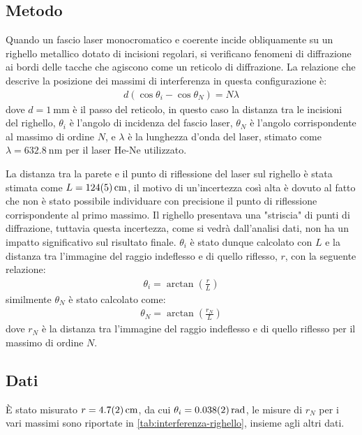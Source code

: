 \documentclass[a4paper]{article}
\begin{document}
\subsection{Metodo}
Quando un fascio laser monocromatico e coerente incide obliquamente su un righello metallico dotato di incisioni regolari, si verificano fenomeni di diffrazione ai bordi delle tacche che agiscono come un reticolo di diffrazione. La relazione che descrive la posizione dei massimi di interferenza in questa configurazione è: 
\begin{align}
    d(\cos\theta_i - \cos\theta_N) = N\lambda
\end{align}
dove $d=\SI{1}{\milli\meter}$ è il passo del reticolo, in questo caso la distanza tra le incisioni del righello, $\theta_i$ è l'angolo di incidenza del fascio laser, $\theta_N$ è l'angolo corrispondente al massimo di ordine $N$, e $\lambda$ è la lunghezza d'onda del laser, stimato come $\lambda=\SI{632.8}{\nano\meter}$ per il laser He-Ne utilizzato.

La distanza tra la parete e il punto di riflessione del laser sul righello è stata stimata come $L=\SI{124 \pm 5}{\centi\meter}$, il motivo di un'incertezza così alta è dovuto al fatto che non è stato possibile individuare con precisione il punto di riflessione corrispondente al primo massimo. Il righello presentava una "striscia" di punti di diffrazione, tuttavia questa incertezza, come si vedrà dall'analisi dati, non ha un impatto significativo sul risultato finale. $\theta_i$ è stato dunque calcolato con $L$ e la distanza tra l'immagine del raggio indeflesso e di quello riflesso, $r$, con la seguente relazione:
\begin{align}   
    \theta_i = \arctan\left(\frac{r}{L}\right)
\end{align}
similmente $\theta_N$ è stato calcolato come:
\begin{align}
    \theta_N = \arctan\left(\frac{r_N}{L}\right)
\end{align}
dove $r_N$ è la distanza tra l'immagine del raggio indeflesso e di quello riflesso per il massimo di ordine $N$.
\subsection{Dati}
È stato misurato $r=\SI{4.7 \pm 0.2}{\centi\meter}$, da cui $\theta_i=\SI{0.038 \pm 0.002}{\radian}$, le misure di $r_N$ per i vari massimi sono riportate in \cref{tab:interferenza-righello}, insieme agli altri dati.
\end{document}
